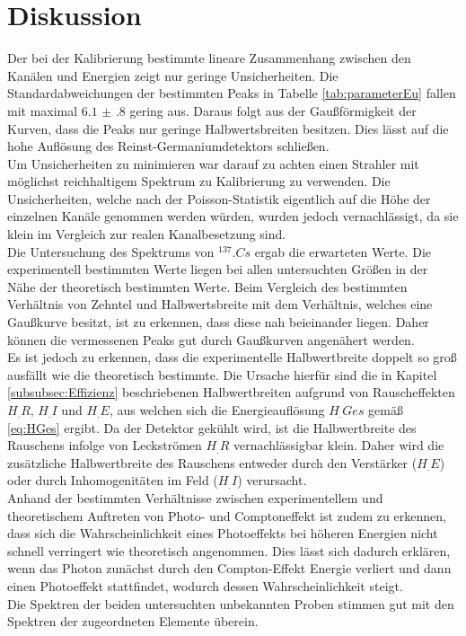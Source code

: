 
\section{Diskussion}
\label{sec:Diskussion}

Der bei der Kalibrierung bestimmte lineare Zusammenhang zwischen den Kanälen und Energien zeigt nur geringe Unsicherheiten. Die Standardabweichungen der bestimmten Peaks in Tabelle \ref{tab:parameterEu} fallen mit maximal $\num{6.1(8)}$ gering aus. Daraus folgt aus der Gaußförmigkeit der Kurven, dass die Peaks nur geringe Halbwertsbreiten besitzen. Dies lässt auf die hohe Auflösung des Reinst-Germaniumdetektors schließen.\\
Um Unsicherheiten zu minimieren war darauf zu achten einen Strahler mit möglichst reichhaltigem Spektrum zu Kalibrierung zu verwenden. Die Unsicherheiten, welche nach der Poisson-Statistik eigentlich auf die Höhe der einzelnen Kanäle genommen werden würden, wurden jedoch vernachlässigt, da sie klein im Vergleich zur realen Kanalbesetzung sind.\\
Die Untersuchung des Spektrums von $^{137}.{Cs}$ ergab die erwarteten Werte.
Die experimentell bestimmten Werte liegen bei allen untersuchten Größen in der Nähe der theoretisch bestimmten Werte.
Beim Vergleich des bestimmten Verhältnis von Zehntel und Halbwertsbreite mit dem Verhältnis, welches eine Gaußkurve besitzt, ist zu erkennen, dass diese nah beieinander liegen. Daher können die vermessenen Peaks gut durch Gaußkurven angenähert werden.\\
Es ist jedoch zu erkennen, dass die experimentelle Halbwertbreite doppelt so groß ausfällt wie die theoretisch bestimmte. Die Ursache hierfür sind die in Kapitel \ref{subsubsec:Effizienz} beschriebenen Halbwertbreiten aufgrund von Rauscheffekten $H_.R$, $H_.I$ und $H_.E$, aus welchen sich die Energieauflösung $H_.{Ges}$ gemäß \eqref{eq:HGes} ergibt. Da der Detektor gekühlt wird, ist die Halbwertbreite des Rauschens infolge von Leckströmen $H_.R$ vernachlässigbar klein. Daher wird die zusätzliche Halbwertbreite des Rauschens entweder durch den Verstärker ($H_.E$) oder durch Inhomogenitäten im Feld ($H_.I$) verursacht.\\
Anhand der bestimmten Verhältnisse zwischen experimentellem und theoretischem Auftreten von Photo- und Comptoneffekt ist zudem zu erkennen, dass sich die Wahrscheinlichkeit eines Photoeffekts bei höheren Energien nicht schnell verringert wie theoretisch angenommen.
Dies lässt sich dadurch erklären, wenn das Photon zunächst durch den Compton-Effekt Energie verliert und dann einen Photoeffekt stattfindet, wodurch dessen Wahrscheinlichkeit steigt.\\
Die Spektren der beiden untersuchten unbekannten Proben stimmen gut mit den Spektren der zugeordneten Elemente überein.